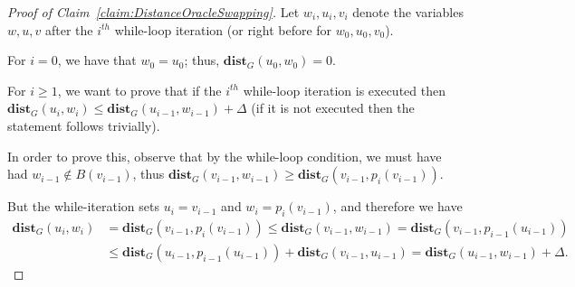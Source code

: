 \begin{proof}[Proof of Claim~\ref{claim:DistanceOracleSwapping}]
Let $w_i, u_i, v_i$ denote the variables $w,u,v$ after the $i^{th}$ while-loop iteration (or right before for $w_0,u_0,v_0$).

For $i = 0$, we have that $w_0 = u_0$; thus, $\mathbf{dist}_G(u_0,w_0) = 0$.

For $i \geq 1$, we want to prove that if the $i^{th}$ while-loop iteration is executed then $\mathbf{dist}_G(u_i,w_i) \leq \mathbf{dist}_G(u_{i-1},w_{i-1}) + \Delta$ (if it is not executed then the statement follows trivially).

In order to prove this, observe that by the while-loop condition, we must have had $w_{i-1} \not\in B(v_{i-1})$, thus  $\mathbf{dist}_G(v_{i-1}, w_{i-1}) \geq \mathbf{dist}_G(v_{i-1}, p_i(v_{i-1}))$.

But the while-iteration sets $u_i = v_{i-1}$ and $w_i = p_i(v_{i-1})$, and therefore we have
\begin{align*}
\mathbf{dist}_G(u_{i}, w_i) &= \mathbf{dist}_G(v_{i-1}, p_i(v_{i-1})) \leq
\mathbf{dist}_G(v_{i-1}, w_{i-1}) = \mathbf{dist}_G(v_{i-1}, p_{i-1}(u_{i-1})) \\
&\leq \mathbf{dist}_G(u_{i-1}, p_{i-1}(u_{i-1})) + \mathbf{dist}_G(v_{i-1}, u_{i-1}) = \mathbf{dist}_G(u_{i-1}, w_{i-1}) + \Delta.
\end{align*}
\end{proof}